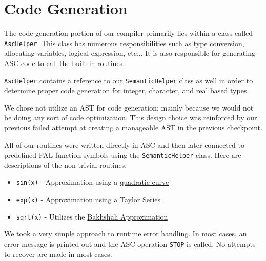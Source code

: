 \documentclass{article}
\begin{document}
\section*{Code Generation}
\begin{description}

\item
	The code generation portion of our compiler primarily lies within a class called \texttt{AscHelper}. This class has numerous
	responsibilities such as type conversion, allocating variables, logical expression, etc... It is also responsible for generating
	ASC code to call the built-in routines.
	
	\texttt{AscHelper} contains a reference to our \texttt{SemanticHelper} class as well in order to determine proper code generation for
	integer, character, and real based types.
	
	We chose not utilize an AST for code generation; mainly because we would not be doing any sort of code optimization. This design choice
	was reinforced by our previous failed attempt at creating a manageable AST in the previous checkpoint.

\item[Built-in Routine Library]
	All of our routines were written directly in ASC and then later connected to predefined PAL function symbols using the \texttt{SemanticHelper}
	class. Here are descriptions of the non-trivial routines:
	\begin{itemize}
		\item
			\texttt{sin(x)} - Approximation using a \href{http://lab.polygonal.de/?p=205}{quadratic curve}
		\item
			\texttt{exp(x)} - Approximation using a \href{http://en.wikipedia.org/wiki/Taylor_series#Approximation_and_convergence}{Taylor Series} 
		\item
			\texttt{sqrt(x)} - Utilizes the \href{http://en.wikipedia.org/wiki/Methods_of_computing_square_roots}{Bakhshali Approximation}
	
	\end{itemize}
	
\item[Runtime Error Handling]
	We took a very simple approach to runtime error handling. In most cases, an error message is printed out and the ASC operation \texttt{STOP} is
	called. No attempts to recover are made in most cases.
	
\end{description}
\end{document}
